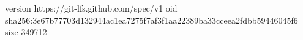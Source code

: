 version https://git-lfs.github.com/spec/v1
oid sha256:3e67b77703d132944ac1ea7275f7af3f1aa22389ba33cceea2fdbb59446045f6
size 349712
